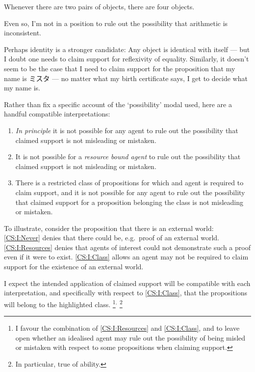 \begin{note}
  Whenever there are two pairs of objects, there are four objects.

  Even so, I'm not in a position to rule out the possibility that arithmetic is inconsistent.

  Perhaps identity is a stronger candidate: Any object is identical with itself --- but I doubt one needs to claim support for reflexivity of equality.
  Similarly, it doesn't seem to be the case that I need to claim support for the proposition that my name is ミスタ --- no matter what my birth certificate says, I get to decide what my name is.

  Rather than fix a specific account of the `possibility' modal used, here are a handful compatible interpretations:

  \begin{enumerate}[label=\Alph*., ref=(\Alph*)]
  \item\label{CS:I:Never} \emph{In principle} it is not possible for any agent to rule out the possibility that claimed support is not misleading or mistaken.
  \item\label{CS:I:Resources} It is not possible for a \emph{resource bound agent} to rule out the possibility that claimed support is not misleading or mistaken.
  \item\label{CS:I:Class} There is a restricted class of propositions for which and agent is required to claim support, and it is not possible for any agent to rule out the possibility that claimed support for a proposition belonging the class is not misleading or mistaken.
  \end{enumerate}

  To illustrate, consider the proposition that there is an external world:
  \ref{CS:I:Never} denies that there could be, e.g.\ proof of an external world.
  \ref{CS:I:Resources} denies that agents of interest could not demonstrate such a proof even if it were to exist.
  \ref{CS:I:Class} allows an agent may not be required to claim support for the existence of an external world.

  I expect the intended application of claimed support will be compatible with each interpretation, and specifically with respect to \ref{CS:I:Class}, that the propositions will belong to the highlighted class.\nolinebreak
  \footnote{
    I favour the combination of \ref{CS:I:Resources} and \ref{CS:I:Class}, and to leave open whether an idealised agent may rule out the possibility of being misled or mistaken with respect to some propositions when claiming support.
  }\(^{,}\)\nolinebreak
  \footnote{
    In particular, true of ability.
  }
\end{note}

